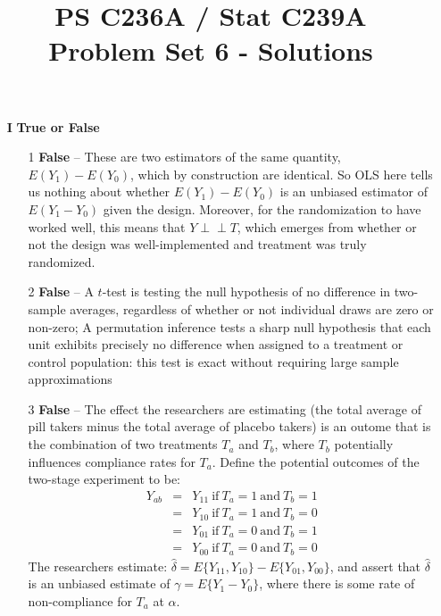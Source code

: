 \documentclass{article}
\newcommand{\indep}{\perp\!\!\!\perp}
\begin{document}
\title{PS C236A / Stat C239A \\ Problem Set 6 - Solutions}
\date{}
\maketitle
\begin{itemize}

\item[{\large \bf I}] {\large \bf True or False}
\begin{itemize}
\item[1] {\bf False} -- These are two estimators of the same quantity,
  $E(Y_1)-E(Y_0)$, which by construction are identical. So OLS here
  tells us nothing about whether $E(Y_1)-E(Y_0)$ is an unbiased
  estimator of $E(Y_1-Y_0)$ given the design.  Moreover, for the
  randomization to have worked well, this means that $Y \indep T$,
  which emerges from whether or not the design was well-implemented
  and treatment was truly randomized.
\item[2] {\bf False} -- A $t$-test is testing the null hypothesis of
  no difference in two-sample averages, regardless of whether or not
  individual draws are zero or non-zero; A permutation inference tests
  a sharp null hypothesis that each unit exhibits precisely no
  difference when assigned to a treatment or control population: this
  test is exact without requiring large sample approximations


\item[3] {\bf False} -- The effect the researchers are estimating (the
  total average of pill takers minus the total average of placebo
  takers) is an outome that is the combination of two treatments
  $T_a$ and $T_b$, where $T_b$ potentially influences compliance rates
  for $T_a$.  Define the potential outcomes of the two-stage
  experiment to be: 
\begin{eqnarray}
\nonumber Y_{ab}& = &Y_{11}\ \text{if}\ T_a=1\ \text{and}\ T_b=1 \\ 
\nonumber& = &Y_{10}\ \text{if}\ T_a=1\ \text{and}\ T_b=0 \\ 
\nonumber& = &Y_{01}\ \text{if}\ T_a=0\ \text{and}\ T_b=1 \\ 
\nonumber& = &Y_{00}\ \text{if}\ T_a=0\ \text{and}\ T_b=0 
\end{eqnarray}
The researchers estimate:
$\hat{\delta}=E\{Y_{11},Y_{10}\}-E\{Y_{01},Y_{00}\}$, and assert that
$\hat{\delta}$ is an unbiased estimate of $\gamma=E\{Y_1-Y_0\}$, where there
is some rate of non-compliance for $T_a$ at $\alpha$. 
\vspace{1em}


\end{itemize}
\end{itemize}
\end{document}
